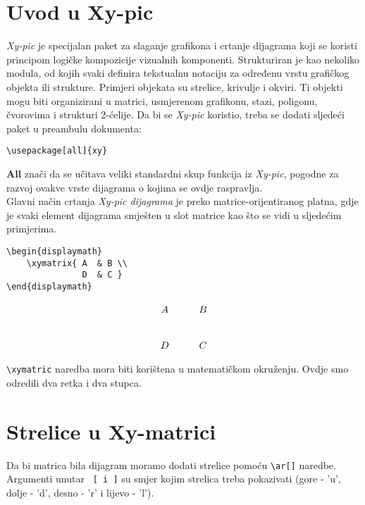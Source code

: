 \section{Uvod u Xy-pic}

\textit{Xy-pic} je specijalan paket za slaganje grafikona i crtanje dijagrama koji se koristi principom logičke kompozicije vizualnih komponenti. Strukturiran je kao nekoliko modula, od kojih svaki definira tekstualnu notaciju za određenu vrstu grafičkog objekta ili strukture. Primjeri objekata su strelice, krivulje i okviri. Ti objekti mogu biti organizirani u matrici, usmjerenom grafikonu, stazi, poligonu, čvorovima i strukturi 2-ćelije. Da bi se \textit{Xy-pic} koristio, treba se dodati sljedeći paket u preambulu dokumenta:

\begin{verbatim}
\usepackage[all]{xy}
\end{verbatim}

\justify
\textbf{All} znači da se učitava veliki standardni skup funkcija iz \textit{Xy-pic}, pogodne za razvoj ovakve vrste dijagrama o kojima se ovdje raspravlja. \\
Glavni način crtanja \textit{Xy-pic dijagrama} je preko matrice-orijentiranog platna, gdje je svaki element dijagrama smješten u slot matrice kao što se vidi u sljedećim primjerima. \\

\begin{center}
\begin{verbatim}
\begin{displaymath}
    \xymatrix{ A  & B \\
               D  & C }
\end{displaymath}
\end{verbatim}

\begin{displaymath}
    \xymatrix{ A  & B \\
               D  & C  }
\end{displaymath}
\end{center}
\justify
\verb|\xymatric| naredba mora biti korištena u matematičkom okruženju. Ovdje smo odredili dva retka i dva stupca.
\newpage

\section{Strelice u Xy-matrici}

 Da bi matrica bila dijagram moramo dodati strelice pomoću \verb|\ar[]| naredbe. Argumenti unutar \verb| [ i ]| su smjer kojim strelica treba pokazivati (gore - 'u', dolje - 'd', desno - 'r' i lijevo - 'l'). \\

